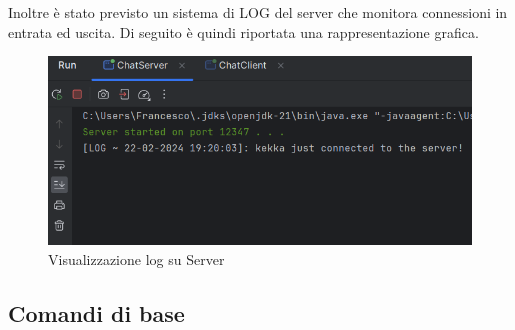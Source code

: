 \newline
Inoltre è stato previsto un sistema di LOG del server che monitora connessioni in entrata ed uscita. Di seguito è quindi riportata una rappresentazione grafica.
\begin{figure}[h]
  \centering
  \begin{minipage}{0.45\textwidth}
    \includegraphics[width=\linewidth]{imagens/outputs/2_3.png}
    \caption{Visualizzazione log su Server}
  \end{minipage}\hfill
\end{figure}
\newpage

\subsection{Comandi di base}
